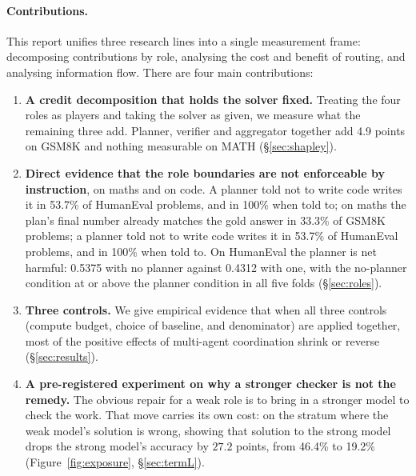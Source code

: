 \documentclass[11pt,a4paper]{article}
\begin{document}
\paragraph{Contributions.} This report unifies three research lines into a single measurement frame: decomposing contributions by role, analysing the cost and benefit of routing, and analysing information flow. There are four main contributions:
\begin{enumerate}\itemsep2pt
  \item \textbf{A credit decomposition that holds the solver fixed.} Treating the four roles as players and taking the solver as given, we measure what the remaining three add. Planner, verifier and aggregator together add 4.9 points on GSM8K and nothing measurable on MATH (\S\ref{sec:shapley}).
  \item \textbf{Direct evidence that the role boundaries are not enforceable by instruction}, on maths and on code. A planner told not to write code writes it in 53.7\% of HumanEval problems, and in 100\% when told to; on maths the plan's final number already matches the gold answer in 33.3\% of GSM8K problems; a planner told not to write code writes it in 53.7\% of HumanEval problems, and in 100\% when told to. On HumanEval the planner is net harmful: 0.5375 with no planner against 0.4312 with one, with the no-planner condition at or above the planner condition in all five folds (\S\ref{sec:roles}).
  \item \textbf{Three controls.} We give empirical evidence that when all three controls (compute budget, choice of baseline, and denominator) are applied together, most of the positive effects of multi-agent coordination shrink or reverse (\S\ref{sec:results}).
  \item \textbf{A pre-registered experiment on why a stronger checker is not the remedy.} The obvious repair for a weak role is to bring in a stronger model to check the work. That move carries its own cost: on the stratum where the weak model's solution is wrong, showing that solution to the strong model drops the strong model's accuracy by $27.2$ points, from 46.4\% to 19.2\% (Figure~\ref{fig:exposure}, \S\ref{sec:termL}).
\end{enumerate}
\end{document}

